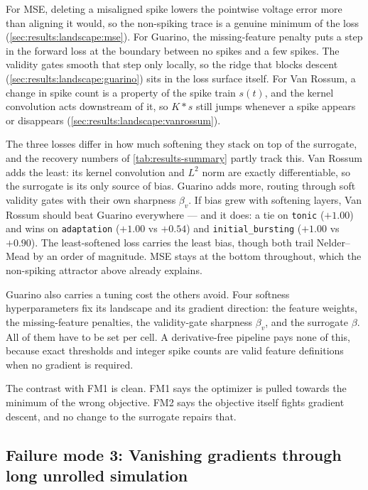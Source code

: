 For \gls{MSE}, deleting a misaligned spike lowers the pointwise voltage error more than aligning it would, so the non-spiking trace is a genuine minimum of the loss (\cref{sec:results:landscape:mse}).
For Guarino, the missing-feature penalty puts a step in the forward loss at the boundary between no spikes and a few spikes.
The validity gates smooth that step only locally, so the ridge that blocks descent (\cref{sec:results:landscape:guarino}) sits in the loss surface itself.
For Van Rossum, a change in spike count is a property of the spike train $s(t)$, and the kernel convolution acts downstream of it, so $K\ast s$ still jumps whenever a spike appears or disappears (\cref{sec:results:landscape:vanrossum}).

The three losses differ in how much softening they stack on top of the surrogate, and the recovery numbers of \cref{tab:results-summary} partly track this.
Van Rossum adds the least: its kernel convolution and $L^2$ norm are exactly differentiable, so the surrogate is its only source of bias.
Guarino adds more, routing through soft validity gates with their own sharpness $\beta_v$.
If bias grew with softening layers, Van Rossum should beat Guarino everywhere --- and it does: a tie on \texttt{tonic} ($+1.00$) and wins on \texttt{adaptation} ($+1.00$ vs $+0.54$) and \texttt{initial\_bursting} ($+1.00$ vs $+0.90$).
The least-softened loss carries the least bias, though both trail Nelder--Mead by an order of magnitude.
\gls{MSE} stays at the bottom throughout, which the non-spiking attractor above already explains.

Guarino also carries a tuning cost the others avoid.
Four softness hyperparameters fix its landscape and its gradient direction: the feature weights, the missing-feature penalties, the validity-gate sharpness $\beta_v$, and the surrogate $\beta$.
All of them have to be set per cell.
A derivative-free pipeline pays none of this, because exact thresholds and integer spike counts are valid feature definitions when no gradient is required.

The contrast with FM1 is clean.
FM1 says the optimizer is pulled towards the minimum of the wrong objective.
FM2 says the objective itself fights gradient descent, and no change to the surrogate repairs that.

\subsection{Failure mode 3: Vanishing gradients through long unrolled simulation}\label{sec:discussion:decay}

